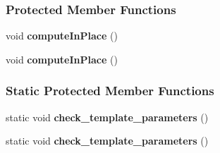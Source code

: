 \subsubsection*{Protected Member Functions}
\begin{DoxyCompactItemize}
\item 
\mbox{\label{group___q_r___module_a813e30375adb7cc8972aa831d9792a83}} 
void {\bfseries compute\+In\+Place} ()
\item 
\mbox{\label{group___q_r___module_a89bda2aea3ccce21717bca8c6ae1ee90}} 
void {\bfseries compute\+In\+Place} ()
\end{DoxyCompactItemize}
\subsubsection*{Static Protected Member Functions}
\begin{DoxyCompactItemize}
\item 
\mbox{\label{group___q_r___module_aac6705b86a79ec4998a26da5b3722ac5}} 
static void {\bfseries check\+\_\+template\+\_\+parameters} ()
\item 
\mbox{\label{group___q_r___module_aac6705b86a79ec4998a26da5b3722ac5}} 
static void {\bfseries check\+\_\+template\+\_\+parameters} ()
\end{DoxyCompactItemize}
